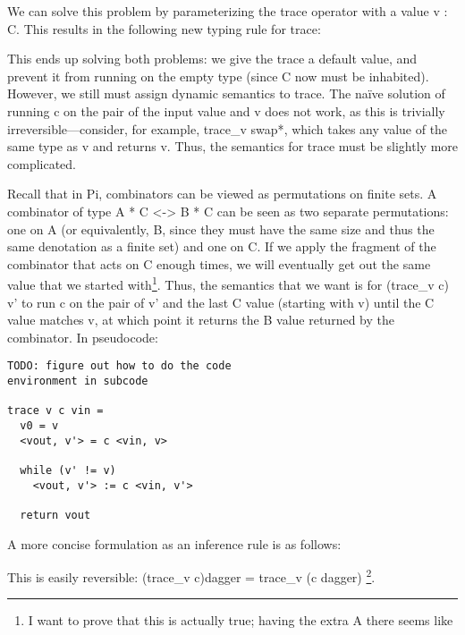\documentclass{sigplanconf}
\begin{document}
We can solve this problem by parameterizing the trace operator with a value {{v
: C}}. This results in the following new typing rule for trace:


\noindent
This ends up solving both problems: we give the trace a default value, and
prevent it from running on the empty type (since {{C}} now must be inhabited).
However, we still must assign dynamic semantics to trace. The na\"ive solution
of running {{c}} on the pair of the input value and {{v}} does not work, as this
is trivially irreversible---consider, for example, {{trace_v swap*}}, which
takes any value of the same type as {{v}} and returns {{v}}. Thus, the semantics
for {{trace}} must be slightly more complicated.

Recall that in {{Pi}}, combinators can be viewed as permutations on finite sets.
A combinator of type {{A * C <-> B * C}} can be seen as two separate
permutations: one on {{A}} (or equivalently, B, since they must have the same
size and thus the same denotation as a finite set) and one on {{C}}. If we
apply the fragment of the combinator that acts on {{C}} enough times, we will
eventually get out the same value that we started with\footnote{I want to prove
that this is actually true; having the extra {{A}} there seems like it might
complicate things.}. Thus, the semantics that we want is for {{(trace_v c) v'}}
to run {{c}} on the pair of {{v'}} and the last {{C}} value (starting with
{{v}}) until the {{C}} value matches {{v}}, at which point it returns the {{B}}
value returned by the combinator. In pseudocode:

\begin{verbatim}
TODO: figure out how to do the code 
environment in subcode

trace v c vin =
  v0 = v
  <vout, v'> = c <vin, v>

  while (v' != v)
    <vout, v'> := c <vin, v'>

  return vout
\end{verbatim}

A more concise formulation as an inference rule is as follows:


This is easily reversible: {{(trace_v c)dagger = trace_v (c dagger)}}
\footnote{Also need to prove this.}.

\end{document}
